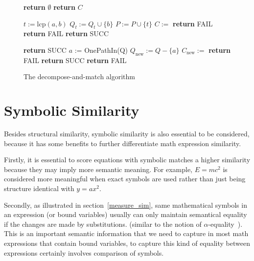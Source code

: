 \begin{figure}
\begin{algorithmic}[1]

\State \textbf{return} $\emptyset$ 
\Else
{} 
\EndIf
\EndFor
\State \textbf{return} $C$
\EndProcedure

\State {}

\State $t := \mathrm{lcp}(a,b)$
\State $Q_t := Q_t \cup \{b\}$
\State $P := P \cup \{t\}$
\EndFor
{}
\State $C := $ 
\State \textbf{return} FAIL
\EndIf
\EndIf
\EndFor
\EndFor
{} 
\State \textbf{return} FAIL
\EndIf
\EndFor
\State \textbf{return} SUCC 
\EndProcedure

\State {}

 \textbf{return} SUCC 
\EndIf
\State $a$ := OnePathIn(Q)
\State $Q_{\mathrm{new}} := Q - \{a\}$
\State $C_{\mathrm{new}} := $ 
 \textbf{return} FAIL 
\EndIf
{}
\textbf{return} SUCC 
\EndIf
\EndFor
\State \textbf{return} FAIL
\EndProcedure

\end{algorithmic}
\caption{The decompose-and-match algorithm}\label{submatchalgo}
\end{figure}

\section{Symbolic Similarity}
Besides structural similarity, symbolic similarity is also essential to be considered,
because it has some benefits to further differentiate math expression similarity.

Firstly, it is essential to score equations with symbolic matches a higher similarity because they may imply more semantic meaning. 
For example, $E=mc^2$ is considered more meaningful when exact symbols are used rather than just being structure identical with $y=ax^2$.

Secondly, as illustrated in section~\ref{measure_sim}, same mathematical symbols in an expression (or bound variables) usually can only maintain semantical equality if the changes are made by substitutions. (similar to the notion of $\alpha$-equality~\cite{Hindley1986}). 
This is an important semantic information that we need to capture 
in most math expressions that contain bound variables, to capture this kind of equality between expressions certainly involves comparison of symbols. 

